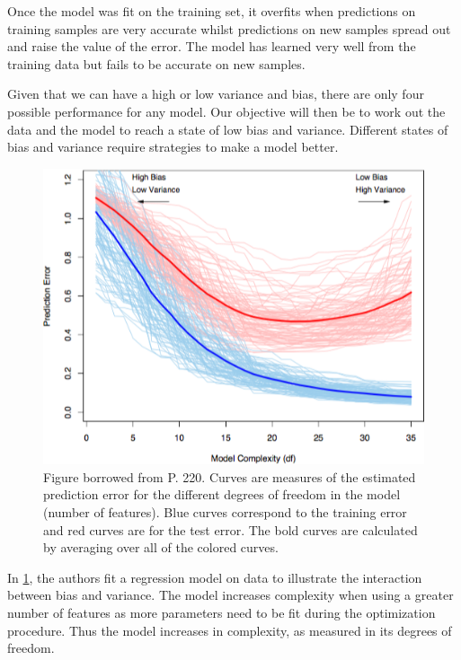 Once the model was fit on the training set, it overfits when predictions on training samples are very accurate whilst predictions on new samples spread out and raise the value of the error. The model has learned very well from the training data but fails to be accurate on new samples.

Given that we can have a high or low variance and bias, there are only four possible performance for any model. Our objective will then be to work out the data and the model to reach a state of low bias and variance. Different states of bias and variance require strategies to make a model better.



\begin{figure}[h!]
\begin{center}
\includegraphics[width=0.7\columnwidth]{figures/figure-biasVariance/figure-biasVariance}
\caption{\label{figure-biasVariance} Figure borrowed from \protect\textcite{hastie-elemstatslearn} P. 220. Curves are measures of the estimated prediction error for the different degrees of freedom in the model (number of features). Blue curves correspond to the training error and red curves are for the test error. The bold curves are calculated by averaging over all of the colored curves.%
}
\end{center}
\end{figure}

In \ref{figure-biasVariance}, the authors fit a regression model on data to illustrate the interaction between bias and variance. The model increases complexity when using a greater number of features as more parameters need to be fit during the optimization procedure. Thus the model increases in complexity, as measured in its degrees of freedom.

